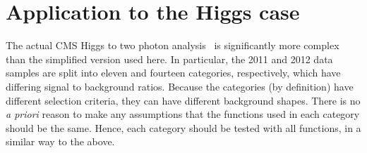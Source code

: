 
\section{Application to the Higgs case}
\label{sec:discussion}
\label{sec:discussion:higgs}


The actual CMS
Higgs to two photon analysis~\cite{ref:introduction:legacy}
is significantly more
complex than the simplified version used here. In particular, the 2011 
and 2012 data
samples are split into eleven and fourteen categories, respectively, which have
differing signal to background ratios.
Because the categories (by definition) have different selection criteria,
they can have different background shapes.
There is no {\it a priori} reason to make any assumptions that the functions
used in each category should be the same. Hence, each category should be
tested with all functions, in a similar way to the above.

